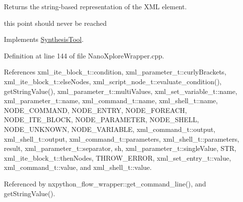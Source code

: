 Returns the string-\/based representation of the X\+ML element. 

this point should never be reached 

Implements \hyperlink{classSynthesisTool_a98c5ba46f950300e1a5ca7cfcb409852}{Synthesis\+Tool}.



Definition at line 144 of file Nano\+Xplore\+Wrapper.\+cpp.



References xml\+\_\+ite\+\_\+block\+\_\+t\+::condition, xml\+\_\+parameter\+\_\+t\+::curly\+Brackets, xml\+\_\+ite\+\_\+block\+\_\+t\+::else\+Nodes, xml\+\_\+script\+\_\+node\+\_\+t\+::evaluate\+\_\+condition(), get\+String\+Value(), xml\+\_\+parameter\+\_\+t\+::multi\+Values, xml\+\_\+set\+\_\+variable\+\_\+t\+::name, xml\+\_\+parameter\+\_\+t\+::name, xml\+\_\+command\+\_\+t\+::name, xml\+\_\+shell\+\_\+t\+::name, N\+O\+D\+E\+\_\+\+C\+O\+M\+M\+A\+ND, N\+O\+D\+E\+\_\+\+E\+N\+T\+RY, N\+O\+D\+E\+\_\+\+F\+O\+R\+E\+A\+CH, N\+O\+D\+E\+\_\+\+I\+T\+E\+\_\+\+B\+L\+O\+CK, N\+O\+D\+E\+\_\+\+P\+A\+R\+A\+M\+E\+T\+ER, N\+O\+D\+E\+\_\+\+S\+H\+E\+LL, N\+O\+D\+E\+\_\+\+U\+N\+K\+N\+O\+WN, N\+O\+D\+E\+\_\+\+V\+A\+R\+I\+A\+B\+LE, xml\+\_\+command\+\_\+t\+::output, xml\+\_\+shell\+\_\+t\+::output, xml\+\_\+command\+\_\+t\+::parameters, xml\+\_\+shell\+\_\+t\+::parameters, result, xml\+\_\+parameter\+\_\+t\+::separator, sh, xml\+\_\+parameter\+\_\+t\+::single\+Value, S\+TR, xml\+\_\+ite\+\_\+block\+\_\+t\+::then\+Nodes, T\+H\+R\+O\+W\+\_\+\+E\+R\+R\+OR, xml\+\_\+set\+\_\+entry\+\_\+t\+::value, xml\+\_\+command\+\_\+t\+::value, and xml\+\_\+shell\+\_\+t\+::value.



Referenced by nxpython\+\_\+flow\+\_\+wrapper\+::get\+\_\+command\+\_\+line(), and get\+String\+Value().

